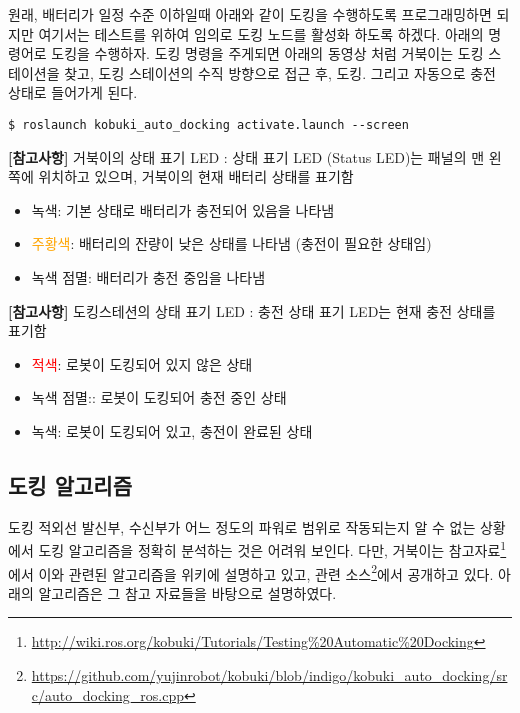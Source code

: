 원래, 배터리가 일정 수준 이하일때 아래와 같이 도킹을 수행하도록 프로그래밍하면 되지만 여기서는 테스트를 위하여 임의로 도킹 노드를 활성화 하도록 하겠다. 아래의 명령어로 도킹을 수행하자. 도킹 명령을 주게되면 아래의 동영상 처럼 거북이는 도킹 스테이션을 찾고, 도킹 스테이션의 수직 방향으로 접근 후, 도킹. 그리고 자동으로 충전 상태로 들어가게 된다.

\vspace{\baselineskip}
\begin{lstlisting}[language=ROS]
$ roslaunch kobuki_auto_docking activate.launch --screen
\end{lstlisting}

\vspace{\baselineskip}
\textbf{[참고사항]} 거북이의 상태 표기 LED : 상태 표기 LED (Status LED)는 패널의 맨 왼쪽에 위치하고 있으며, 거북이의 현재 배터리 상태를 표기함
\begin{itemize}[leftmargin=*]
\item {\color{limegreen}녹색}: 기본 상태로 배터리가 충전되어 있음을 나타냄
\item \textcolor{orange}{주황색}: 배터리의 잔량이 낮은 상태를 나타냄 (충전이 필요한 상태임)
\item {\color{limegreen}녹색 점멸}: 배터리가 충전 중임을 나타냄
\end{itemize}

\vspace{\baselineskip}
\textbf{[참고사항]} 도킹스테션의 상태 표기 LED : 충전 상태 표기 LED는 현재 충전 상태를 표기함
\begin{itemize}[leftmargin=*]
\item \textcolor{red}{적색}: 로봇이 도킹되어 있지 않은 상태
\item {\color{limegreen}녹색 점멸}:: 로봇이 도킹되어 충전 중인 상태
\item {\color{limegreen}녹색}: 로봇이 도킹되어 있고, 충전이 완료된 상태
\end{itemize}

\subsection{도킹 알고리즘}

도킹 적외선 발신부, 수신부가 어느 정도의 파워로 범위로 작동되는지 알 수 없는 상황에서 도킹 알고리즘을 정확히 분석하는 것은 어려워 보인다. 다만, 거북이는 참고자료\footnote{\url{http://wiki.ros.org/kobuki/Tutorials/Testing\%20Automatic\%20Docking}}에서 이와 관련된 알고리즘을 위키에 설명하고 있고, 관련 소스\footnote{\url{https://github.com/yujinrobot/kobuki/blob/indigo/kobuki_auto_docking/src/auto_docking_ros.cpp}}에서 공개하고 있다. 아래의 알고리즘은 그 참고 자료들을 바탕으로 설명하였다.

